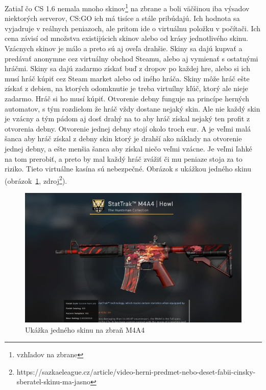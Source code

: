 \documentclass[10pt,oneside,slovak,a4paper]{article}
\begin{document}
Zatiaľ čo CS 1.6 nemala mnoho skinov\footnote{vzhľadov na zbrane} na zbrane a boli väčšinou iba výsadov niektorých serverov, CS:GO ich má tisíce a stále pribúdajú. Ich hodnota sa vyjadruje v reálnych peniazoch, ale pritom ide o virtuálnu položku v počítači. Ich cena závisí od množstva existijúcich skinov alebo od krásy jednotlivého skinu. Vzácnych skinov je málo a preto sú aj oveľa drahšie. Skiny sa dajú kupvať a predávať anonymne cez virtuálny obchod Steamu, alebo aj vymienať s ostatnými hráčmi.
Skiny sa dajú zadarmo získať buď z dropov po každej hre, alebo si ich musí hráč kúpiť cez Steam market alebo od iného hráča. Skiny môže hráč ešte získať z debien, na ktorých odomknutie je treba virtuílny kľúč, ktorý ale nieje zadarmo. Hráč si ho musí kúpiť. Otvorenie debny funguje na princípe herných automatov, s tým rozdielom že hráč vždy dostane nejaký skin. Ale nie každý skin je vzácny a tým pádom aj dosť drahý na to aby hráč získal nejaký ten profit z otvorenia debny. Otvorenie jednej debny stojí okolo troch eur. A je veľmi malá šanca aby hráč získal z debny skin ktorý je drahší ako náklady na otvorenie jednej debny, a ešte menšia šanca aby získal niečo veľmi vzácne. Je veľmi ľahké na tom prerobiť, a preto by mal každý hráč zvážiť či mu peniaze stoja za to riziko. Tieto virtuálne kasína sú nebezpečné.  Obrázok s ukážkou jedného skinu (obrázok~\ref{f:skiny}, zdroj\footnote{https://sazkaeleague.cz/article/video-herni-predmet-nebo-deset-fabii-cinsky-sberatel-skinu-ma-jasno}).

\begin{figure}[tbh]
\centering
\includegraphics[scale=0.45]{skin.jpg}
\caption{Ukážka jedného skinu na zbraň M4A4}
\label{f:skiny}
\end{figure}
\end{document}
